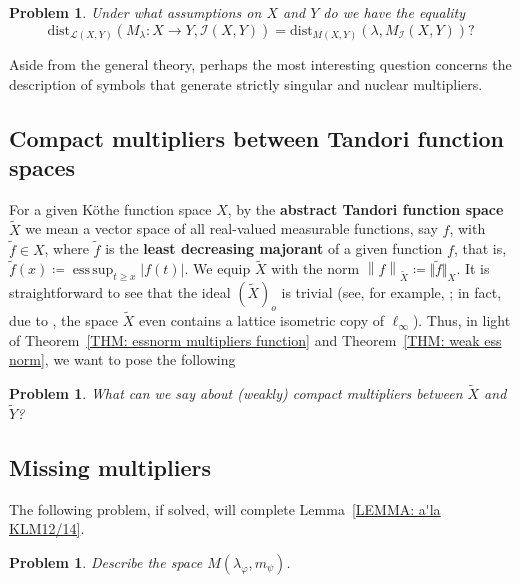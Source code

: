 \documentclass[11pt]{amsart}
\theoremstyle{definition}
\theoremstyle{definition}
\theoremstyle{definition}
\theoremstyle{definition}
\theoremstyle{definition}
\theoremstyle{definition}
\theoremstyle{definition}
\theoremstyle{definition}
\numberwithin{equation}{section}
\numberwithin{equation}{section}
\numberwithin{equation}{section}
\theoremstyle{definition}
\theoremstyle{definition}
\theoremstyle{definition}
\theoremstyle{definition}
\theoremstyle{definition}
\theoremstyle{definition}
\newtheorem{problem}[theorem]{Problem}
\DeclareMathOperator*{\esssup}{ess\,sup}
\newcommand{\norm}[1]{\left\lVert#1\right\rVert}
\newcommand{\abs}[1]{\left\lvert#1\right\rvert}
\begin{document}
\begin{problem}
	{\it Under what assumptions on $X$ and $Y$ do we have the equality}
	\begin{equation*}
		\text{dist}_{\mathscr{L}(X,Y)}(M_{\lambda} \colon X \rightarrow Y,\mathscr{I}(X,Y)) = \text{dist}_{M(X,Y)}(\lambda, M_{\mathscr{I}}(X,Y)) \textit{?}
	\end{equation*}
\end{problem}

Aside from the general theory, perhaps the most interesting question concerns the description of symbols that generate strictly singular and nuclear multipliers.

\subsection{Compact multipliers between Tandori function spaces}

For a given K{\" o}the function space $X$, by the {\bf abstract Tandori function space $\widetilde{X}$} we mean a vector space of all real-valued measurable functions,
say $f$, with $\widetilde{f} \in X$, where $\widetilde{f}$ is the {\bf least decreasing majorant} of a given function $f$,
that is, $\widetilde{f}(x) \coloneqq \esssup_{t \geqslant x} \abs{f(t)}$.
We equip $\widetilde{X}$ with the norm $\norm{f}_{\widetilde{X}} \coloneqq \Vert \widetilde{f} \Vert_X$.
It is straightforward to see that the ideal $(\widetilde{X})_o$ is trivial (see, for example, \cite[Theorem~1(e)]{LM15a};
in fact, due to \cite[Proposition~4.8]{KKM21}, the space $\widetilde{X}$ even contains a lattice isometric copy of $\ell_{\infty}$).
Thus, in light of Theorem~\ref{THM: essnorm multipliers function} and Theorem~\ref{THM: weak ess norm}, we want to pose the following

\begin{problem}
	{\it What can we say about (weakly) compact multipliers between $\widetilde{X}$ and $\widetilde{Y}$?}
\end{problem}

\subsection{Missing multipliers}

The following problem, if solved, will complete Lemma~\ref{LEMMA: a'la KLM12/14}.

\begin{problem}
	{\it Describe the space $M(\lambda_{\varphi}, m_{\psi})$.}
\end{problem}
	
\end{document}

